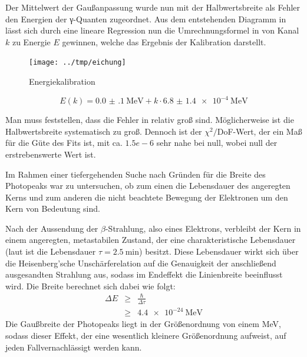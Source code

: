 Der Mittelwert der Gaußanpassung wurde nun mit der Halbwertsbreite als Fehler
den Energien der γ-Quanten zugeordnet. Aus dem entstehenden Diagramm in
 lässt sich durch eine lineare Regression nun die
Umrechnungsformel in  von Kanal $k$ zu Energie $E$ gewinnen,
welche das Ergebnis der Kalibration darstellt.

\begin{figure}[htb]
      \centering
      \texttt{[image: ../tmp/eichung]}
      \caption{Energiekalibration}
      \label{fig:eichung}
\end{figure}

\begin{equation}
 E(k) = \SI{0.0(1)}{\mega\eV} + k\cdot\SI{6.8(14)e-4}{\mega\eV}
 \label{eqn:eichung}
\end{equation}

Man muss feststellen, dass die Fehler in  relativ groß sind.
Möglicherweise ist die Halbwertsbreite systematisch zu groß. Dennoch ist der
$\chi^2/$DoF-Wert, der ein Maß für die Güte des Fits ist, mit ca. $1.5e-6$
sehr nahe bei null, wobei null der erstrebenswerte Wert ist.

Im Rahmen einer tiefergehenden Suche nach Gründen für die Breite des Photopeaks
war zu untersuchen, ob zum einen die Lebensdauer des angeregten Kerns und zum
anderen die nicht beachtete Bewegung der Elektronen um den Kern von Bedeutung
sind.

Nach der Aussendung der $\beta$-Strahlung, also eines Elektrons, verbleibt der
Kern in einem angeregten, metastabilen Zustand, der eine charakteristische
Lebensdauer (laut \cite[Abb. 4]{script} ist die Lebensdauer $\tau =
\SI{2,5}{\minute}$) besitzt. Diese Lebensdauer wirkt sich über die
Heisenberg'sche Unschärferelation auf die Genauigkeit der anschließend
ausgesandten Strahlung aus, sodass im Endeffekt die Linienbreite beeinflusst
wird. Die Breite berechnet sich dabei wie folgt:
\begin{eqnarray}
\Delta E &\geq& \frac{\hbar}{\Delta \tau}\\
&\geq& \SI{4,4e-24}{\mega\eV}
\end{eqnarray}
Die Gaußbreite der Photopeaks liegt in der Größenordnung von einem MeV, sodass
dieser Effekt, der eine wesentlich kleinere Größenordnung aufweist, auf jeden
Fallvernachlässigt werden kann.


